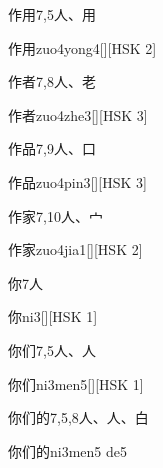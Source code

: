 \begin{entry}{作用}{7,5}{⼈、⽤}
  \begin{phonetics}{作用}{zuo4yong4}[][HSK 2]
  \end{phonetics}
\end{entry}

\begin{entry}{作者}{7,8}{⼈、⽼}
  \begin{phonetics}{作者}{zuo4zhe3}[][HSK 3]
  \end{phonetics}
\end{entry}

\begin{entry}{作品}{7,9}{⼈、⼝}
  \begin{phonetics}{作品}{zuo4pin3}[][HSK 3]
  \end{phonetics}
\end{entry}

\begin{entry}{作家}{7,10}{⼈、⼧}
  \begin{phonetics}{作家}{zuo4jia1}[][HSK 2]
  \end{phonetics}
\end{entry}

\begin{entry}{你}{7}{⼈}
  \begin{phonetics}{你}{ni3}[][HSK 1]
  \end{phonetics}
\end{entry}

\begin{entry}{你们}{7,5}{⼈、⼈}
  \begin{phonetics}{你们}{ni3men5}[][HSK 1]
  \end{phonetics}
\end{entry}

\begin{entry}{你们的}{7,5,8}{⼈、⼈、⽩}
  \begin{phonetics}{你们的}{ni3men5 de5}
  \end{phonetics}
\end{entry}

